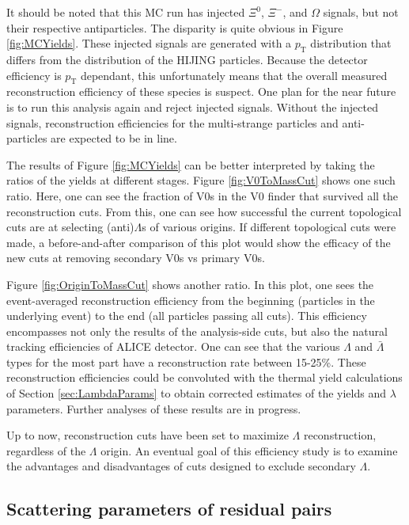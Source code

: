 It should be noted that this MC run has injected $\Xi^0$, $\Xi^-$, and $\Omega$ signals, but not their respective antiparticles.  The disparity is quite obvious in Figure \ref{fig:MCYields}.  These injected signals are generated with a $p_\mathrm{T}$ distribution that differs from the distribution of the HIJING particles.  Because the detector efficiency is $p_\mathrm{T}$ dependant, this unfortunately means that the overall measured reconstruction efficiency of these species is suspect.  One plan for the near future is to run this analysis again and reject injected signals.  Without the injected signals, reconstruction efficiencies for the multi-strange particles and anti-particles are expected to be in line.

The results of Figure \ref{fig:MCYields} can be better interpreted by taking the ratios of the yields at different stages.  Figure \ref{fig:V0ToMassCut} shows one such ratio.  Here, one can see the fraction of V0s in the V0 finder that survived all the reconstruction cuts.  From this, one can see how successful the current topological cuts are at selecting (anti)$\Lambda$s of various origins.   If different topological cuts were made, a before-and-after comparison of this plot would show the efficacy of the new cuts at removing secondary V0s vs primary V0s.

Figure \ref{fig:OriginToMassCut} shows another ratio.  In this plot, one sees the event-averaged reconstruction efficiency from the beginning (particles in the underlying event) to the end (all particles passing all cuts).  This efficiency encompasses not only the results of the analysis-side cuts, but also the natural tracking efficiencies of ALICE detector.  One can see that the various $\Lambda$ and $\bar{\Lambda}$ types for the most part have a reconstruction rate between 15-25\%.  These reconstruction efficiencies could be convoluted with the thermal yield calculations of Section \ref{sec:LambdaParams} to obtain corrected estimates of the yields and $\lambda$ parameters.  Further analyses of these results are in progress.

Up to now, reconstruction cuts have been set to maximize $\Lambda$ reconstruction, regardless of the $\Lambda$ origin.  An eventual goal of this efficiency study is to examine the advantages and disadvantages of cuts designed to exclude secondary $\Lambda$.

\subsection{Scattering parameters of residual pairs}
\label{sec:ScatteringParams}


